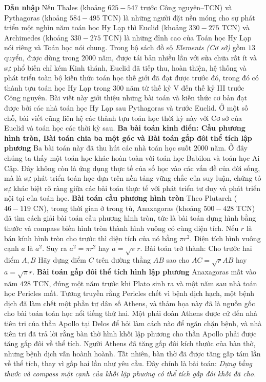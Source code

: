 \vspace*{145pt}

\begin{multicols}{2}
	\textbf{\color{lichsutoanhoc}Dẫn nhập}
	\vskip 0.1cm
	Nếu Thales (khoảng $625-547$ trước Công nguyên--TCN) và Pythagoras (khoảng $584-495$ TCN) là những người đặt nền móng cho sự phát triển một nghìn năm toán học Hy Lạp thì Euclid (khoảng $330-275$ TCN) và Archimedes (khoảng $330-275$ TCN) là những đỉnh cao của Toán học Hy Lạp nói riêng và Toán học nói chung. Trong bộ sách đồ sộ \textit{Elements (Cơ sở)}  gồm $13$ quyển, được dùng trong $2000$ năm, được tái bản nhiều lần với sửa chữa rất ít và sự phổ biến chỉ kém Kinh thánh, Euclid đã tiếp thu, hoàn thiện, hệ thống và phát triển toàn bộ kiến thức toán học thế giới đã đạt được trước đó, trong đó có thành tựu toán học Hy Lạp trong 300 năm từ thế kỷ V đến thế kỷ III trước Công nguyên. 
	\vskip 0.1cm
	Bài viết này giới thiệu những bài toán và kiến thức cơ bản đạt được bởi các nhà toán học Hy Lạp sau Pythagoras và trước Euclid. Ở một số chỗ, bài viết cũng liên hệ các thành tựu toán học thời kỳ này với Cơ sở của Euclid và toán học các thời kỳ sau.    
	\vskip 0.1cm
	\textbf{\color{lichsutoanhoc}Ba bài toán kinh điển: Cầu phương hình tròn, Bài toán chia ba một góc và Bài toán gấp đôi thể tích lập phương}
	\vskip 0.1cm
	Ba bài toán này đã thu hút các nhà toán học suốt $2000$ năm. Ở đây chúng ta thấy một toán học khác hoàn toàn với toán học Babilon và toán học Ai Cập. Đây không còn là ứng dụng thực tế của số học vào các vấn đề của đời sống, mà là sự phát triển toán học dựa trên nền tảng vững chắc  của suy luận, chứng tỏ sự khác biệt rõ ràng giữa các bài toán thực tế với phát triển tư duy và phát triển nội tại của toán học.
	\vskip 0.1cm
	\textbf{\color{lichsutoanhoc}Bài toán cầu phương hình tròn}
	\vskip 0.1cm
	Theo Plutarch ($46-119$ CN), trong thời gian ở trong tù, Anaxagoras (khoảng $500-428$ TCN) đã tìm cách giải bài toán cầu phương hình tròn, tức là bài toán dựng hình bằng thước và compass biến hình tròn thành hình vuông có cùng diện tích. 
	\vskip 0.1cm
	Nếu $r$ là bán kính hình tròn cho trước thì diện tích của nó bằng $\pi r^2$. Diện tích hình vuông cạnh $a$  là $a^2$. Suy ra  $a^2 = \pi r^2$ hay  $a=\sqrt{\pi}r$. Bài toán trở thành: Cho trước hai điểm $A,B$ Hãy dựng điểm $C$  trên đường thẳng  $AB$  sao cho $AC = \sqrt{r}AB$  hay $a= \sqrt{\pi}r$.
	\vskip 0.1cm 
	\textbf{\color{lichsutoanhoc}Bài toán gấp đôi thể tích hình lập phương}
	\vskip 0.1cm
	Anaxagoras mất vào năm $428$ TCN, đúng một năm trước khi Plato sinh ra và một năm sau nhà toán học Pericles mất. Tương truyền rằng Pericles chết vì bệnh dịch hạch, một bệnh dịch đã làm chết một phần tư dân số Athens, và thảm họa này đã là nguồn gốc cho bài toán toán học nổi tiếng thứ hai. Một phái đoàn Athens được cử đến nhà tiên tri của thần Apollo tại Delos để hỏi làm cách nào để ngăn chặn bệnh, và nhà tiên tri đã trả lời rằng bàn thờ hình khối lập phương cho thần Apollo phải được tăng gấp đôi về thể tích. Người Athens đã tăng gấp đôi kích thước của bàn thờ, nhưng bệnh dịch vẫn hoành hoành. Tất nhiên, bàn thờ đã được tăng gấp tám lần về thể tích, thay vì gấp hai lần như yêu cầu. Đây chính là bài toán: \textit{Dựng bằng thước và compass một cạnh của khối lập phương có thể tích gấp đôi khối đã cho.}

\end{multicols}
